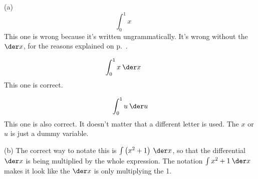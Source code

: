 (a)
\begin{equation*}
  \int_0^1 x \qquad
\end{equation*}
This one is wrong because it's written ungrammatically. It's wrong without the
$\der x$, for the reasons explained on p.~\pageref{why-you-need-dx}.

\begin{equation*}
  \int_0^1 x\:\der x \qquad
\end{equation*}
This one is correct.

\begin{equation*}
  \int_0^1 u\:\der u 
\end{equation*}
This one is also correct. It doesn't matter that a different letter is used. The $x$ or $u$ is
just a dummy variable.

(b) The correct way to notate this is $\int \left(x^2+1\right)\:\der x$,
so that the differential $\der x$ is being multiplied by the whole expression.
The notation $\int x^2+1 \:\der x$ makes it look like the $\der x$ is only
multiplying the 1.
